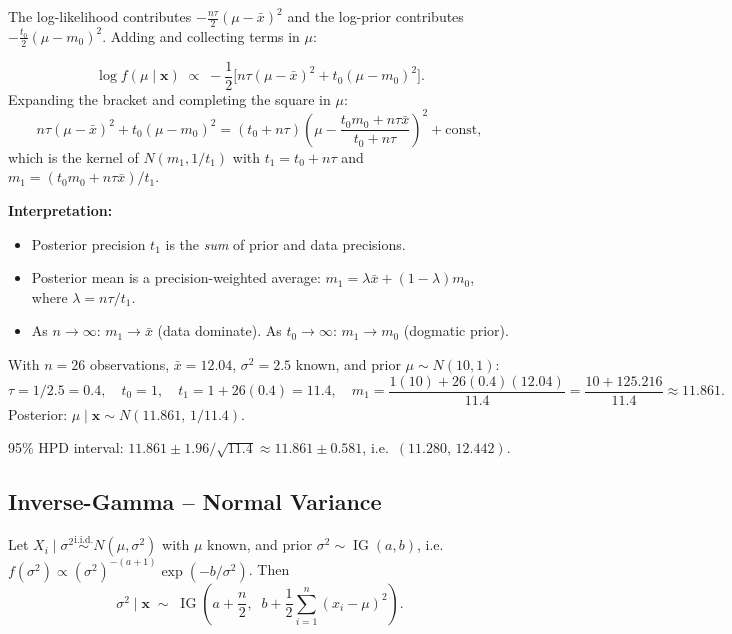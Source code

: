\documentclass[11pt, a4paper]{article}
\newcommand{\iid}{\overset{\text{i.i.d.}}{\sim}}
\begin{document}
\begin{exbox}
The log-likelihood contributes $-\frac{n\tau}{2}(\mu - \bar{x})^2$ and the log-prior contributes $-\frac{t_0}{2}(\mu - m_0)^2$. Adding and collecting terms in $\mu$:

\[
  \log f(\mu \mid \mathbf{x}) \;\propto\; -\frac{1}{2}\bigl[n\tau(\mu-\bar{x})^2 + t_0(\mu-m_0)^2\bigr].
\]
Expanding the bracket and completing the square in $\mu$:
\[
  n\tau(\mu-\bar{x})^2 + t_0(\mu-m_0)^2 = (t_0+n\tau)\!\left(\mu - \frac{t_0m_0+n\tau\bar{x}}{t_0+n\tau}\right)^{\!2} + \text{const},
\]
which is the kernel of $N(m_1, 1/t_1)$ with $t_1 = t_0+n\tau$ and $m_1 = (t_0m_0+n\tau\bar{x})/t_1$. \medskip

\textbf{Interpretation:}
\begin{itemize}
  \item Posterior precision $t_1$ is the \emph{sum} of prior and data precisions.
  \item Posterior mean is a precision-weighted average: $m_1 = \lambda\bar{x} + (1-\lambda)m_0$, where $\lambda = n\tau/t_1$.
  \item As $n \to \infty$: $m_1 \to \bar{x}$ (data dominate). As $t_0 \to \infty$: $m_1 \to m_0$ (dogmatic prior).
\end{itemize}
\end{exbox}

\begin{exbox}
With $n = 26$ observations, $\bar{x} = 12.04$, $\sigma^2 = 2.5$ known, and prior $\mu \sim N(10, 1)$:
\[
  \tau = 1/2.5 = 0.4, \quad t_0 = 1, \quad
  t_1 = 1 + 26(0.4) = 11.4, \quad
  m_1 = \frac{1(10) + 26(0.4)(12.04)}{11.4} = \frac{10 + 125.216}{11.4} \approx 11.861.
\]
Posterior: $\mu \mid \mathbf{x} \sim N(11.861,\, 1/11.4)$.

95\% HPD interval: $11.861 \pm 1.96/\sqrt{11.4} \approx 11.861 \pm 0.581$, i.e.\ $(11.280,\, 12.442)$.
\end{exbox}

\subsection*{Inverse-Gamma -- Normal Variance}

\begin{thmbox}
Let $X_i \mid \sigma^2 \iid N(\mu, \sigma^2)$ with $\mu$ known, and prior $\sigma^2 \sim \operatorname{IG}(a, b)$, i.e.\ $f(\sigma^2) \propto (\sigma^2)^{-(a+1)}\exp(-b/\sigma^2)$. Then
\[
  \sigma^2 \mid \mathbf{x} \;\sim\; \operatorname{IG}\!\left(a + \frac{n}{2},\;\; b + \frac{1}{2}\sum_{i=1}^n(x_i - \mu)^2\right).
\]
\end{thmbox}
\end{document}
